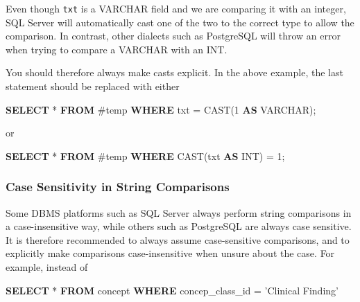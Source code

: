 \documentclass[11pt]{book}
\newenvironment{Shaded}{\begin{snugshade}}{\end{snugshade}}
\newcommand{\KeywordTok}[1]{\textcolor[rgb]{0.13,0.29,0.53}{\textbf{#1}}}
\newcommand{\DataTypeTok}[1]{\textcolor[rgb]{0.13,0.29,0.53}{#1}}
\newcommand{\DecValTok}[1]{\textcolor[rgb]{0.00,0.00,0.81}{#1}}
\newcommand{\StringTok}[1]{\textcolor[rgb]{0.31,0.60,0.02}{#1}}
\newcommand{\FunctionTok}[1]{\textcolor[rgb]{0.00,0.00,0.00}{#1}}
\newcommand{\NormalTok}[1]{#1}
\theoremstyle{definition}
\theoremstyle{definition}
\theoremstyle{definition}
\theoremstyle{remark}
\begin{document}
Even though \texttt{txt} is a VARCHAR field and we are comparing it with
an integer, SQL Server will automatically cast one of the two to the
correct type to allow the comparison. In contrast, other dialects such
as PostgreSQL will throw an error when trying to compare a VARCHAR with
an INT.

You should therefore always make casts explicit. In the above example,
the last statement should be replaced with either

\begin{Shaded}
\begin{Highlighting}[]
\KeywordTok{SELECT}\NormalTok{ * }\KeywordTok{FROM}\NormalTok{ #temp }\KeywordTok{WHERE}\NormalTok{ txt = }\FunctionTok{CAST}\NormalTok{(}\DecValTok{1} \KeywordTok{AS} \DataTypeTok{VARCHAR}\NormalTok{);}
\end{Highlighting}
\end{Shaded}

or

\begin{Shaded}
\begin{Highlighting}[]
\KeywordTok{SELECT}\NormalTok{ * }\KeywordTok{FROM}\NormalTok{ #temp }\KeywordTok{WHERE} \FunctionTok{CAST}\NormalTok{(txt }\KeywordTok{AS} \DataTypeTok{INT}\NormalTok{) = }\DecValTok{1}\NormalTok{;}
\end{Highlighting}
\end{Shaded}

\subsubsection*{Case Sensitivity in String
Comparisons}\label{case-sensitivity-in-string-comparisons}

Some DBMS platforms such as SQL Server always perform string comparisons
in a case-insensitive way, while others such as PostgreSQL are always
case sensitive. It is therefore recommended to always assume
case-sensitive comparisons, and to explicitly make comparisons
case-insensitive when unsure about the case. For example, instead of

\begin{Shaded}
\begin{Highlighting}[]
\KeywordTok{SELECT}\NormalTok{ * }\KeywordTok{FROM}\NormalTok{ concept }\KeywordTok{WHERE}\NormalTok{ concep_class_id = }\StringTok{'Clinical Finding'}
\end{Highlighting}
\end{Shaded}
\end{document}
